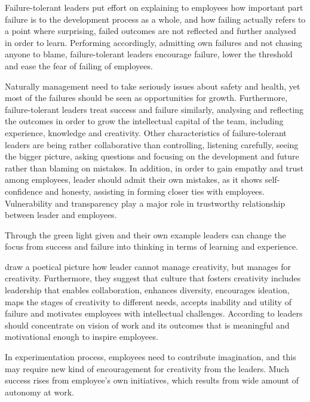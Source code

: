 Failure-tolerant leaders put effort on explaining to employees how important part failure is to the development process as a whole, and how failing actually refers to a point where surprising, failed outcomes are not reflected and further analysed in order to learn. Performing accordingly, admitting own failures and not chasing anyone to blame, failure-tolerant leaders encourage failure, lower the threshold and ease the fear of failing of employees. \citep{farson2002failuretolerantleader}

Naturally management need to take seriously issues about safety and health, yet most of the failures should be seen as opportunities for growth. Furthermore, failure-tolerant leaders treat success and failure similarly, analysing and reflecting the outcomes in order to grow the intellectual capital of the team, including experience, knowledge and creativity. Other characteristics of failure-tolerant leaders are being rather collaborative than controlling, listening carefully, seeing the bigger picture, asking questions and focusing on the development and future rather than blaming on mistakes. In addition, in order to gain empathy and trust among employees, leader should admit their own mistakes, as it shows self-confidence and honesty, assisting in forming closer ties with employees. Vulnerability and transparency play a major role in trustworthy relationship between leader and employees.  \citep{farson2002failuretolerantleader}

Through the green light given and their own example leaders can change the focus from success and failure into thinking in terms of learning and experience. \citep{farson2002failuretolerantleader}

\citet{amabile2008creativity} draw a poetical picture how leader cannot manage creativity, but manages for creativity. Furthermore, they suggest that culture that fosters creativity includes leadership that enables collaboration, enhances diversity, encourages ideation, maps the stages of creativity to different needs, accepts inability and utility of failure and motivates employees with intellectual challenges. According to \citet{sosik1999leadership} leaders should concentrate on vision of work and its outcomes that is meaningful and motivational enough to inspire employees. 

In experimentation process, employees need to contribute imagination, and this may require new kind of encouragement for creativity from the leaders. Much success rises from employee's own initiatives, which results from wide amount of autonomy at work. \citep{amabile2008creativity}

